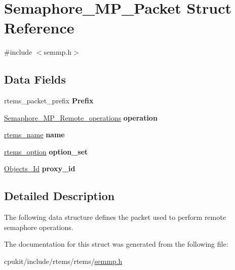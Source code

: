 \hypertarget{structSemaphore__MP__Packet}{}\section{Semaphore\+\_\+\+M\+P\+\_\+\+Packet Struct Reference}
\label{structSemaphore__MP__Packet}


{\ttfamily \#include $<$semmp.\+h$>$}

\subsection*{Data Fields}
\begin{DoxyCompactItemize}
\item 
\mbox{\label{structSemaphore__MP__Packet_a2ef0ca09862641baef0a4402665c2af7}} 
rtems\+\_\+packet\+\_\+prefix {\bfseries Prefix}
\item 
\mbox{\label{structSemaphore__MP__Packet_a387b0175b4202bdfc208b9dac8bb7e39}} 
\mbox{\hyperlink{group__ClassicSEM_ga24fc0fecc46118303c1de1742a2c5adf}{Semaphore\+\_\+\+M\+P\+\_\+\+Remote\+\_\+operations}} {\bfseries operation}
\item 
\mbox{\label{structSemaphore__MP__Packet_a9f8191a24b7e8483f32af7a376e53e50}} 
\mbox{\hyperlink{group__ClassicTasks_ga55fb63c49f68c0cbd9bee004da15b1fd}{rtems\+\_\+name}} {\bfseries name}
\item 
\mbox{\label{structSemaphore__MP__Packet_a8390decde58413d952619c3965cf4dee}} 
\mbox{\hyperlink{group__ClassicOptions_gad26685eb0e60a9650082935c31920e29}{rtems\+\_\+option}} {\bfseries option\+\_\+set}
\item 
\mbox{\label{structSemaphore__MP__Packet_ad97d5581d7517a8dff659249e3b44be7}} 
\mbox{\hyperlink{group__RTEMSScoreObject_ga5821f52a51072941bdd603e542d0863e}{Objects\+\_\+\+Id}} {\bfseries proxy\+\_\+id}
\end{DoxyCompactItemize}


\subsection{Detailed Description}
The following data structure defines the packet used to perform remote semaphore operations. 

The documentation for this struct was generated from the following file\+:\begin{DoxyCompactItemize}
\item 
cpukit/include/rtems/rtems/\mbox{\hyperlink{semmp_8h}{semmp.\+h}}\end{DoxyCompactItemize}
